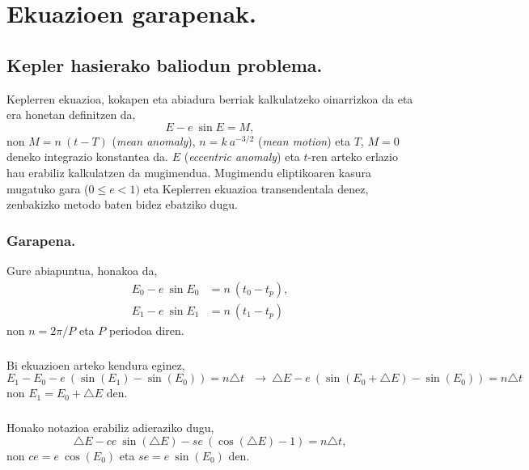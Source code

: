 \chapter{Ekuazioen garapenak.}
\label{eranskin:B}

\section{Kepler hasierako baliodun problema.}
\label{erans:B1}

Keplerren ekuazioa, kokapen eta abiadura berriak kalkulatzeko oinarrizkoa da eta era honetan definitzen da,
\begin{equation*}
E-e \ \sin E = M,
\end{equation*}
non $M=n \ (t-T)$ (\emph{mean anomaly}), $n=k \ a^{-3/2}$ (\emph{mean motion}) eta $T$, $M=0$ deneko integrazio konstantea da. $E$ (\emph{eccentric anomaly}) eta $t$-ren arteko erlazio hau erabiliz kalkulatzen da mugimendua. Mugimendu eliptikoaren kasura mugatuko gara ($0\leq e < 1)$ eta Keplerren ekuazioa transendentala denez, zenbakizko metodo baten bidez ebatziko dugu.

\subsection*{Garapena.}

Gure abiapuntua, honakoa da,
\begin{align*}
E_0-e \ \sin E_0 & =n \ (t_0-t_p), \\
E_1-e \ \sin E_1 & =n \ (t_1-t_p)
\end{align*}
non $n=2\pi/P$ eta $P$ periodoa diren.

\paragraph*{} Bi ekuazioen arteko kendura eginez,
\begin{equation*}
E_1-E_0-e \ (\sin(E_1)-\sin(E_0))=n \triangle t \ \ \ \longrightarrow \ \triangle E - e \ (\sin(E_0+\triangle E)-\sin(E_0))=n \triangle t
\end{equation*}
non $E_1=E_0+\triangle E$ den.  

\paragraph*{} Honako notazioa erabiliz adieraziko dugu,
\begin{equation*}
\triangle E - ce \ \sin(\triangle E)- se \ (\cos(\triangle E)-1)=n \triangle t,
\end{equation*}
non $ce=e \ \cos(E_0)$ eta $se=e \ \sin(E_0)$ den.

